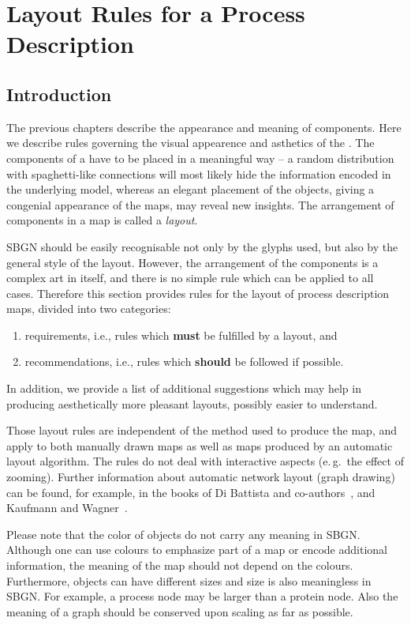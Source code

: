 \chapter{Layout Rules for a Process Description}
\label{chp:layout}

\section{Introduction}

The previous chapters describe the appearance and meaning of \SBGNPDLone components. Here we describe rules governing the visual appearence and asthetics of the \PDl. The components of a \PD have to be placed in a meaningful way -- a random distribution with spaghetti-like connections will most likely hide the information encoded in the underlying model, whereas an elegant placement of the objects, giving a congenial appearance of the maps, may reveal new insights. The arrangement of components in a map is called a \emph{layout}.

SBGN \PDs should be easily recognisable not only by the
glyphs used, but also by the general style of the layout. However, the
arrangement of the components is a complex art in itself, and there is
no simple rule which can be applied to all cases. Therefore this
section provides rules for the layout of process description maps, divided
into two categories:
\begin{enumerate}
  \item requirements, i.e., rules which \textbf{must} be fulfilled by a
  layout, and
  \item recommendations, i.e., rules which \textbf{should} be followed if
  possible. 
\end{enumerate}
In addition, we provide a list of additional suggestions which may help in producing aesthetically more pleasant layouts, possibly easier to understand.

Those layout rules are independent of the method used to produce
the map, and apply to both manually drawn maps as well as
maps produced by an automatic layout algorithm. The rules do
not deal with interactive aspects (e.\,g.~the effect of zooming). Further information about automatic network layout
(graph drawing) can be found, for example, in the books of Di Battista and
co-authors~\cite{DiBattista:1998}, and Kaufmann and Wagner~\cite{Kaufmann:2001}.

Please note that the color of objects do not carry any meaning in
SBGN. Although one can use colours to emphasize part of a map or
encode additional information, the meaning of the map should not
depend on the colours. Furthermore, objects can have different sizes
and size is also meaningless in SBGN. For example, a process node
may be larger than a protein node. Also the meaning of a graph
should be conserved upon scaling as far as possible.

